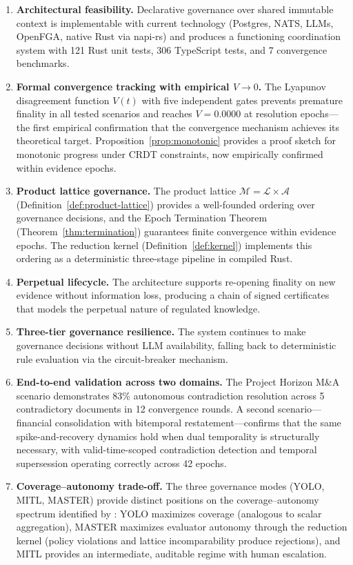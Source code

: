 \documentclass[11pt]{article}
\begin{document}
\begin{enumerate}
  \item \textbf{Architectural feasibility.} Declarative governance over shared immutable context is implementable with current technology (Postgres, NATS, LLMs, OpenFGA, native Rust via napi-rs) and produces a functioning coordination system with 121 Rust unit tests, 306 TypeScript tests, and 7 convergence benchmarks.
  \item \textbf{Formal convergence tracking with empirical $V \to 0$.} The Lyapunov disagreement function $V(t)$ with five independent gates prevents premature finality in all tested scenarios and reaches $V = 0.0000$ at resolution epochs---the first empirical confirmation that the convergence mechanism achieves its theoretical target. Proposition~\ref{prop:monotonic} provides a proof sketch for monotonic progress under CRDT constraints, now empirically confirmed within evidence epochs.
  \item \textbf{Product lattice governance.} The product lattice $\mathcal{M} = \mathcal{L} \times \mathcal{A}$ (Definition~\ref{def:product-lattice}) provides a well-founded ordering over governance decisions, and the Epoch Termination Theorem (Theorem~\ref{thm:termination}) guarantees finite convergence within evidence epochs. The reduction kernel (Definition~\ref{def:kernel}) implements this ordering as a deterministic three-stage pipeline in compiled Rust.
  \item \textbf{Perpetual lifecycle.} The architecture supports re-opening finality on new evidence without information loss, producing a chain of signed certificates that models the perpetual nature of regulated knowledge.
  \item \textbf{Three-tier governance resilience.} The system continues to make governance decisions without LLM availability, falling back to deterministic rule evaluation via the circuit-breaker mechanism.
  \item \textbf{End-to-end validation across two domains.} The Project Horizon M\&A scenario demonstrates 83\% autonomous contradiction resolution across 5 contradictory documents in 12 convergence rounds. A second scenario---financial consolidation with bitemporal restatement---confirms that the same spike-and-recovery dynamics hold when dual temporality is structurally necessary, with valid-time-scoped contradiction detection and temporal supersession operating correctly across 42 epochs.
  \item \textbf{Coverage--autonomy trade-off.} The three governance modes (YOLO, MITL, MASTER) provide distinct positions on the coverage--autonomy spectrum identified by \cite{delachica2026}: YOLO maximizes coverage (analogous to scalar aggregation), MASTER maximizes evaluator autonomy through the reduction kernel (policy violations and lattice incomparability produce rejections), and MITL provides an intermediate, auditable regime with human escalation.
\end{enumerate}
\end{document}
